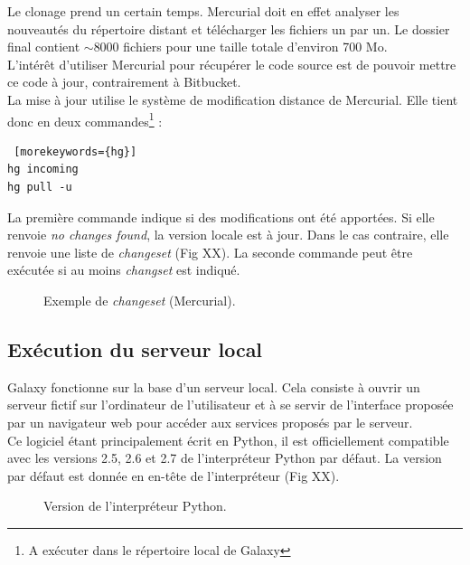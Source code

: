 Le clonage prend un certain temps. Mercurial doit en effet analyser les nouveautés du répertoire distant et télécharger les fichiers un par un. Le dossier final contient $\sim$8000 fichiers pour une taille totale d'environ 700 Mo.\\

L'intérêt d'utiliser Mercurial pour récupérer le code source est de pouvoir mettre ce code à jour, contrairement à Bitbucket.\\
La mise à jour utilise le système de modification distance de Mercurial. Elle tient donc en deux commandes\footnote{A exécuter dans le répertoire local de Galaxy} : 
\lstset{language=sh}
\begin{lstlisting} [morekeywords={hg}]
hg incoming
hg pull -u
 \end{lstlisting} 
 \newpage
 La première commande indique si des modifications ont été apportées. Si elle renvoie \textit{no changes found}, la version locale est à jour. Dans le cas contraire, elle renvoie une liste de \textit{changeset} (Fig XX). La seconde commande peut être exécutée si au moins \textit{changset} est indiqué.

\begin{figure}[!h]
 \centering

\caption{Exemple de \textit{changeset} (Mercurial).}
\end{figure}

\subsection{Exécution du serveur local}

Galaxy fonctionne sur la base d'un serveur local. Cela consiste à ouvrir un serveur fictif sur l'ordinateur de l'utilisateur et à se servir de l'interface proposée par un navigateur web pour accéder aux services proposés par le serveur.\\

Ce logiciel étant principalement écrit en Python, il est officiellement compatible avec les versions 2.5, 2.6 et 2.7 de l'interpréteur Python par défaut. La version par défaut est donnée en en-tête de l'interpréteur  
(Fig XX).

 \begin{figure}[!h]
 \centering
{}
\caption{Version de l'interpréteur Python.}
\end{figure}

